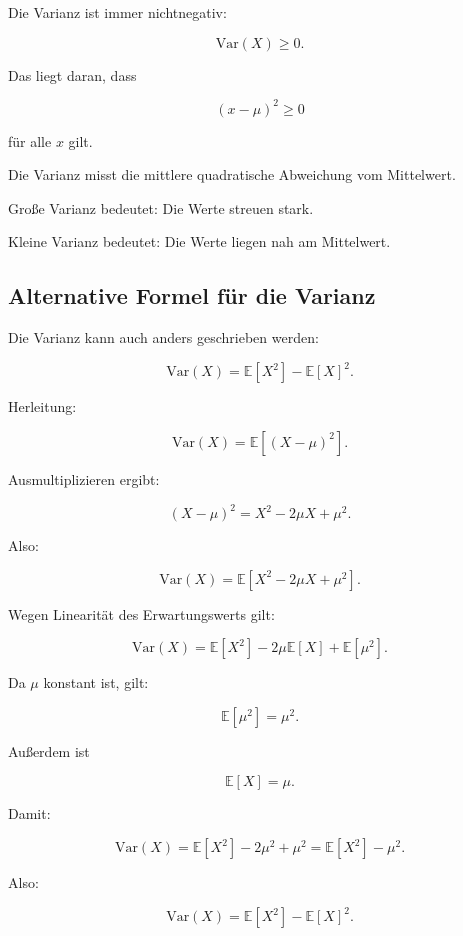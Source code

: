 Die Varianz ist immer nichtnegativ:

\[
    \mathrm{Var}(X) \geq 0.
\]

Das liegt daran, dass

\[
    (x-\mu)^2 \geq 0
\]

für alle \(x\) gilt.

\begin{conceptbox}
Die Varianz misst die mittlere quadratische Abweichung vom Mittelwert.

Große Varianz bedeutet:
Die Werte streuen stark.

Kleine Varianz bedeutet:
Die Werte liegen nah am Mittelwert.
\end{conceptbox}

\subsection{Alternative Formel für die Varianz}

Die Varianz kann auch anders geschrieben werden:

\[
    \mathrm{Var}(X)
    =
    \mathbb{E}[X^2]
    -
    \mathbb{E}[X]^2.
\]

Herleitung:

\[
    \mathrm{Var}(X)
    =
    \mathbb{E}\left[(X-\mu)^2\right].
\]

Ausmultiplizieren ergibt:

\[
    (X-\mu)^2
    =
    X^2 - 2\mu X + \mu^2.
\]

Also:

\[
    \mathrm{Var}(X)
    =
    \mathbb{E}[X^2 - 2\mu X + \mu^2].
\]

Wegen Linearität des Erwartungswerts gilt:

\[
    \mathrm{Var}(X)
    =
    \mathbb{E}[X^2]
    -
    2\mu \mathbb{E}[X]
    +
    \mathbb{E}[\mu^2].
\]

Da \(\mu\) konstant ist, gilt:

\[
    \mathbb{E}[\mu^2] = \mu^2.
\]

Außerdem ist

\[
    \mathbb{E}[X] = \mu.
\]

Damit:

\[
    \mathrm{Var}(X)
    =
    \mathbb{E}[X^2]
    -
    2\mu^2
    +
    \mu^2
    =
    \mathbb{E}[X^2]
    -
    \mu^2.
\]

Also:

\[
    \mathrm{Var}(X)
    =
    \mathbb{E}[X^2]
    -
    \mathbb{E}[X]^2.
\]

